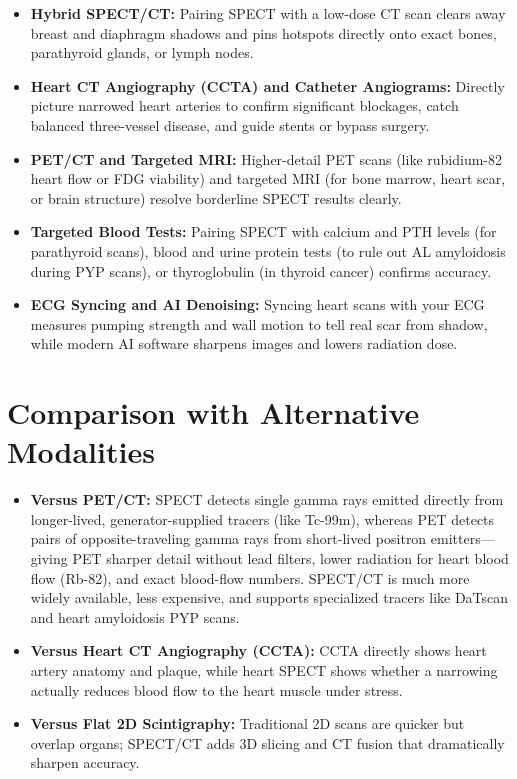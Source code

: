 \begin{itemize}
    \item \textbf{Hybrid SPECT/CT:} Pairing SPECT with a low-dose CT scan clears away breast and diaphragm shadows and pins hotspots directly onto exact bones, parathyroid glands, or lymph nodes.
    \item \textbf{Heart CT Angiography (CCTA) and Catheter Angiograms:} Directly picture narrowed heart arteries to confirm significant blockages, catch balanced three-vessel disease, and guide stents or bypass surgery.
    \item \textbf{PET/CT and Targeted MRI:} Higher-detail PET scans (like rubidium-82 heart flow or FDG viability) and targeted MRI (for bone marrow, heart scar, or brain structure) resolve borderline SPECT results clearly.
    \item \textbf{Targeted Blood Tests:} Pairing SPECT with calcium and PTH levels (for parathyroid scans), blood and urine protein tests (to rule out AL amyloidosis during PYP scans), or thyroglobulin (in thyroid cancer) confirms accuracy.
    \item \textbf{ECG Syncing and AI Denoising:} Syncing heart scans with your ECG measures pumping strength and wall motion to tell real scar from shadow, while modern AI software sharpens images and lowers radiation dose.
\end{itemize}

\section{Comparison with Alternative Modalities}

\begin{itemize}
    \item \textbf{Versus PET/CT:} SPECT detects single gamma rays emitted directly from longer-lived, generator-supplied tracers (like Tc-99m), whereas PET detects pairs of opposite-traveling gamma rays from short-lived positron emitters---giving PET sharper detail without lead filters, lower radiation for heart blood flow (Rb-82), and exact blood-flow numbers. SPECT/CT is much more widely available, less expensive, and supports specialized tracers like DaTscan and heart amyloidosis PYP scans.
    \item \textbf{Versus Heart CT Angiography (CCTA):} CCTA directly shows heart artery anatomy and plaque, while heart SPECT shows whether a narrowing actually reduces blood flow to the heart muscle under stress.
    \item \textbf{Versus Flat 2D Scintigraphy:} Traditional 2D scans are quicker but overlap organs; SPECT/CT adds 3D slicing and CT fusion that dramatically sharpen accuracy.
\end{itemize}

